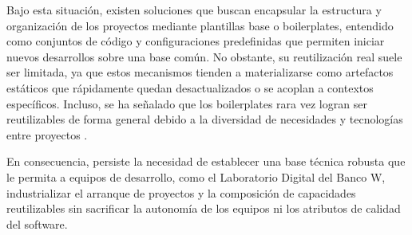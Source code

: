 Bajo esta situación, existen soluciones que buscan encapsular la estructura y organización de los proyectos mediante plantillas base o boilerplates, entendido como conjuntos de código y configuraciones predefinidas que permiten iniciar nuevos desarrollos sobre una base común. No obstante, su reutilización real suele ser limitada, ya que estos mecanismos tienden a materializarse como artefactos estáticos que rápidamente quedan desactualizados o se acoplan a contextos específicos. Incluso, se ha señalado que los boilerplates rara vez logran ser reutilizables de forma general debido a la diversidad de necesidades y tecnologías entre proyectos \citep{SeanPromsopeak2022}.

En consecuencia, persiste la necesidad de establecer una base técnica robusta que le permita a equipos de desarrollo, como el Laboratorio Digital del Banco W, industrializar el arranque de proyectos y la composición de capacidades reutilizables sin sacrificar la autonomía de los equipos ni los atributos de calidad del software.